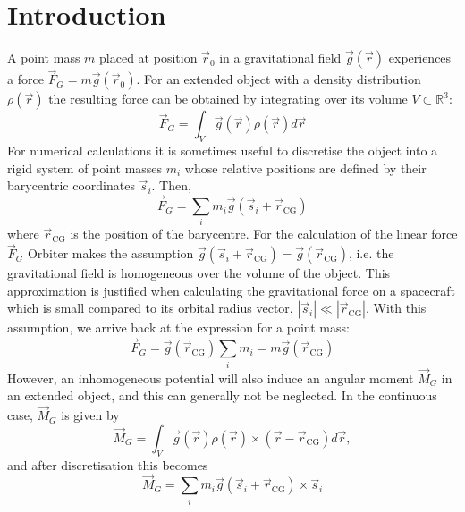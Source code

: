 \documentclass[a4paper]{article}
\begin{document}



\newcommand{\vR}[1]{\ensuremath{\vec{R}_{#1}}}
\newcommand{\nR}[1]{\ensuremath{|\vR{#1}|}}
\newcommand{\mat}[1]{\ensuremath{\mathsf{#1}}}

\maketitle

\section{Introduction}
A point mass $m$ placed at position $\vec{r}_0$ in a gravitational field $\vec{g}(\vec{r})$ experiences a force $\vec{F}_G = m\vec{g}(\vec{r}_0)$.
For an extended object with a density distribution $\rho(\vec{r})$ the resulting force can be obtained by integrating over its volume $V \subset \mathbb{R}^3$:
\begin{equation*}
\vec{F}_G = \int_V \vec{g}(\vec{r})\rho(\vec{r}) d\vec{r}
\end{equation*}
For numerical calculations it is sometimes useful to discretise the object into a rigid system of point masses $m_i$ whose relative positions are defined by their barycentric coordinates $\vec{s}_i$. Then,
\begin{equation*}
\vec{F}_G = \sum_i m_i \vec{g}(\vec{s}_i+\vec{r}_\text{CG})
\end{equation*}
where $\vec{r}_\text{CG}$ is the position of the barycentre. For the calculation of the linear force $\vec{F}_G$ Orbiter makes the assumption $\vec{g}(\vec{s}_i + \vec{r}_\text{CG}) = \vec{g}(\vec{r}_\text{CG})$, i.e. the gravitational field is homogeneous over the volume of the object. This approximation is justified when calculating the gravitational force on a spacecraft which is small compared to its orbital radius vector, $|\vec{s}_i| \ll |\vec{r}_\text{CG}|$. With this assumption, we arrive back at the expression for a point mass:
\begin{equation*}
\vec{F}_G = \vec{g}(\vec{r}_\text{CG}) \sum_i m_i = m \vec{g}(\vec{r}_\text{CG})
\end{equation*}
However, an inhomogeneous potential will also induce an angular moment $\vec{M}_G$ in an extended object, and this can generally not be neglected.
In the continuous case, $\vec{M}_G$ is given by
\begin{equation}\label{eq:cont_torque}
\vec{M}_G = \int_V \vec{g}(\vec{r}) \rho(\vec{r}) \times (\vec{r}-\vec{r}_\text{CG}) d\vec{r},
\end{equation}
and after discretisation this becomes
\begin{equation}\label{eq:torque}
\vec{M}_G = \sum_i m_i \vec{g}(\vec{s}_i + \vec{r}_\text{CG}) \times \vec{s}_i
\end{equation}
\end{document}
